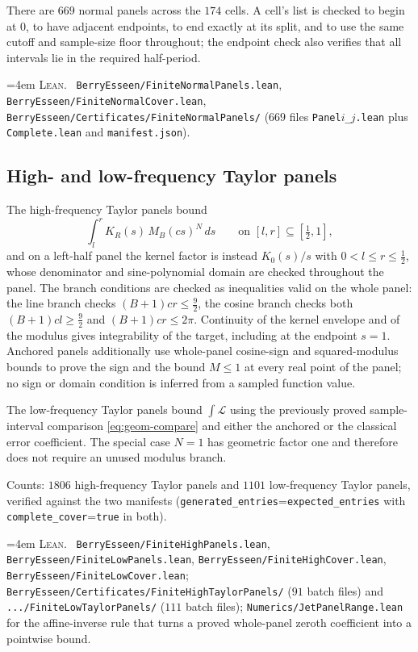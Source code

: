 \documentclass[10pt,a4paper]{article}
\theoremstyle{plain}
\theoremstyle{definition}
\newcommand{\lean}[1]{\texttt{#1}}
\newcommand{\file}[1]{\texttt{#1}}
\newenvironment{leanref}%
  {\par\addvspace{3pt}\begingroup\sloppy\emergencystretch=4em
   \noindent\footnotesize\textsc{Lean.}\ \ignorespaces}%
  {\par\endgroup\addvspace{3pt}}
\begin{document}
There are $669$ normal panels across the $174$ cells. A cell's list is checked
to begin at $0$, to have adjacent endpoints, to end exactly at its split, and to
use the same cutoff and sample-size floor throughout; the endpoint check also
verifies that all intervals lie in the required half-period.

\begin{leanref}
\file{BerryEsseen/FiniteNormalPanels.lean},
\file{BerryEsseen/FiniteNormalCover.lean},
\file{BerryEsseen/Certificates/FiniteNormalPanels/} ($669$ files
\file{Panel$i$\_$j$.lean} plus \file{Complete.lean} and \file{manifest.json}).
\end{leanref}

\subsection{High- and low-frequency Taylor panels}

The high-frequency Taylor panels bound
\[
  \int_l^r K_R(s)\,M_B(cs)^N\,ds
  \qquad\text{on } [l,r]\subseteq[\tfrac12,1],
\]
and on a left-half panel the kernel factor is instead $K_0(s)/s$ with
$0<l\le r\le\tfrac12$, whose denominator and sine-polynomial domain are checked
throughout the panel. The branch conditions are checked as inequalities valid on
the whole panel: the line branch checks $(B+1)cr\le\tfrac92$, the cosine branch
checks both $(B+1)cl\ge\tfrac92$ and $(B+1)cr\le2\pi$. Continuity of the kernel
envelope and of the modulus gives integrability of the target, including at the
endpoint $s=1$. Anchored panels additionally use whole-panel cosine-sign and
squared-modulus bounds to prove the sign and the bound $M\le1$ at every real
point of the panel; no sign or domain condition is inferred from a sampled
function value.

The low-frequency Taylor panels bound $\int\mathcal L$ using the previously
proved sample-interval comparison \eqref{eq:geom-compare} and either the
anchored or the classical error coefficient. The special case $N=1$ has
geometric factor one and therefore does not require an unused modulus branch.

Counts: $1806$ high-frequency Taylor panels and $1101$ low-frequency Taylor
panels, verified against the two manifests
(\lean{generated\_entries}=\lean{expected\_entries} with
\lean{complete\_cover}=\lean{true} in both).

\begin{leanref}
\file{BerryEsseen/FiniteHighPanels.lean},
\file{BerryEsseen/FiniteLowPanels.lean},
\file{BerryEsseen/FiniteHighCover.lean},
\file{BerryEsseen/FiniteLowCover.lean};
\file{BerryEsseen/Certificates/FiniteHighTaylorPanels/} ($91$ batch files) and
\file{.../FiniteLowTaylorPanels/} ($111$ batch files);
\lean{Numerics/JetPanelRange.lean} for the affine-inverse rule that turns a
proved whole-panel zeroth coefficient into a pointwise bound.
\end{leanref}
\end{document}
